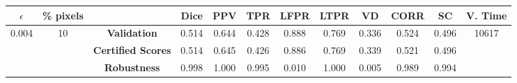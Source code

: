 \begin{longtable}{ c  c | c | c  c  c  c  c  c  c c c}
\toprule \textbf{$\epsilon$} & \textbf{\% pixels} & & \textbf{Dice} & \textbf{PPV} & \textbf{TPR} & \textbf{LFPR} & \textbf{LTPR} & \textbf{VD} & \textbf{CORR} & \textbf{SC} & \textbf{V. Time} \\
\midrule 
\multirow{3}{*}{0.004}  & \multirow{3}{*}{10} &\textbf{Validation} & 0.514 & 0.644 & 0.428 & 0.888 & 0.769 & 0.336 & 0.524 & 0.496 & \multirow{3}{*}{10617} \\
 & & \textbf{Certified Scores} & 0.514 & 0.645 & 0.426 & 0.886 & 0.769 & 0.339 & 0.521 & 0.496 & \\
& & \textbf{Robustness} & 0.998 & 1.000 & 0.995 & 0.010 & 1.000 & 0.005 & 0.989 & 0.994 & \\
\end{longtable}